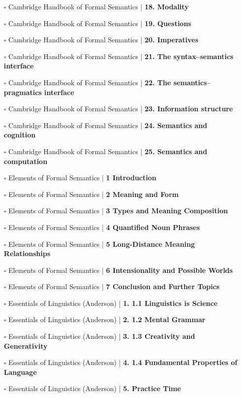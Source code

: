 \documentclass[a4, landscape, 12pt]{article}
\newcommand{\checkbox}{$\square$}%
\begin{document}
\begin{itemize}
{}
\item [\checkbox]  Cambridge Handbook of Formal Semantics | \textbf{ 18. Modality
}
\item [\checkbox]  Cambridge Handbook of Formal Semantics | \textbf{ 19. Questions
}
\item [\checkbox]  Cambridge Handbook of Formal Semantics | \textbf{ 20. Imperatives
}
\item [\checkbox]  Cambridge Handbook of Formal Semantics | \textbf{ 21. The syntax–semantics interface
}
\item [\checkbox]  Cambridge Handbook of Formal Semantics | \textbf{ 22. The semantics–pragmatics interface
}
\item [\checkbox]  Cambridge Handbook of Formal Semantics | \textbf{ 23. Information structure
}
\item [\checkbox]  Cambridge Handbook of Formal Semantics | \textbf{ 24. Semantics and cognition
}
\item [\checkbox]  Cambridge Handbook of Formal Semantics | \textbf{ 25. Semantics and computation
}
\item [\checkbox]  Elements of Formal Semantics | \textbf{ 1 Introduction
}
\item [\checkbox]  Elements of Formal Semantics | \textbf{ 2 Meaning and Form
}
\item [\checkbox]  Elements of Formal Semantics | \textbf{ 3 Types and Meaning Composition
}
\item [\checkbox]  Elements of Formal Semantics | \textbf{ 4 Quantified Noun Phrases
}
\item [\checkbox]  Elements of Formal Semantics | \textbf{ 5 Long-Distance Meaning Relationships
}
\item [\checkbox]  Elements of Formal Semantics | \textbf{ 6 Intensionality and Possible Worlds
}
\item [\checkbox]  Elements of Formal Semantics | \textbf{ 7 Conclusion and Further Topics
}
\item [\checkbox]  Essentials of Linguistics (Anderson) | \textbf{ 1. 1.1 Linguistics is Science
}
\item [\checkbox]  Essentials of Linguistics (Anderson) | \textbf{ 2. 1.2 Mental Grammar
}
\item [\checkbox]  Essentials of Linguistics (Anderson) | \textbf{ 3. 1.3 Creativity and Generativity
}
\item [\checkbox]  Essentials of Linguistics (Anderson) | \textbf{ 4. 1.4 Fundamental Properties of Language
}
\item [\checkbox]  Essentials of Linguistics (Anderson) | \textbf{ 5. Practice Time
}
\end{itemize}
\end{document}
